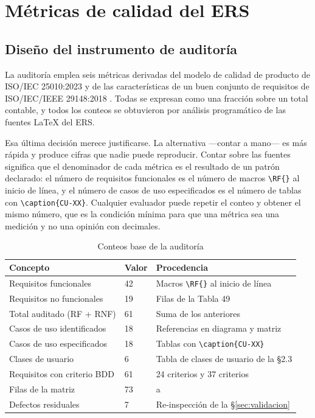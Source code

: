 \section{Métricas de calidad del ERS}
\label{sec:metricas}

\subsection{Diseño del instrumento de auditoría}

La auditoría emplea seis métricas derivadas del modelo de calidad de producto de
ISO/IEC 25010:2023 \cite{iso25010} y de las características de un buen conjunto de requisitos de
ISO/IEC/IEEE 29148:2018 \cite{iso29148}. Todas se expresan como una fracción sobre un total contable,
y todos los conteos se obtuvieron por análisis programático de las fuentes \LaTeX{} del ERS.

Esa última decisión merece justificarse. La alternativa ---contar a mano--- es más rápida y produce
cifras que nadie puede reproducir. Contar sobre las fuentes significa que el denominador de cada
métrica es el resultado de un patrón declarado: el número de requisitos funcionales es el número de
macros \verb|\RF{}| al inicio de línea, y el número de casos de uso especificados es el número de
tablas con \verb|\caption{CU-XX}|. Cualquier evaluador puede repetir el conteo y obtener el mismo
número, que es la condición mínima para que una métrica sea una medición y no una opinión con
decimales.

\begin{table}[H]
\centering\footnotesize
\caption{Conteos base de la auditoría}
\label{tab:conteos}
\begin{tabular}{|L{7.2cm}|C{1.8cm}|L{6.0cm}|}
\hline
{}\textbf{Concepto} & \textbf{Valor} & \textbf{Procedencia}\\ \hline
Requisitos funcionales & 42 & Macros \verb|\RF{}| al inicio de línea\\ \hline
Requisitos no funcionales & 19 & Filas  de la Tabla 49\\ \hline
Total auditado (RF + RNF) & 61 & Suma de los anteriores\\ \hline
Casos de uso identificados & 18 & Referencias  en diagrama y matriz\\ \hline
Casos de uso especificados & 18 & Tablas con \verb|\caption{CU-XX}|\\ \hline
Clases de usuario & 6 & Tabla de clases de usuario de la \S2.3\\ \hline
Requisitos con criterio BDD & 61 & 24 criterios  y 37 criterios \\ \hline
Filas de la matriz & 73 &  a \\ \hline
Defectos residuales & 7 & Re-inspección de la \S\ref{sec:validacion}\\ \hline
\end{tabular}
\end{table}

